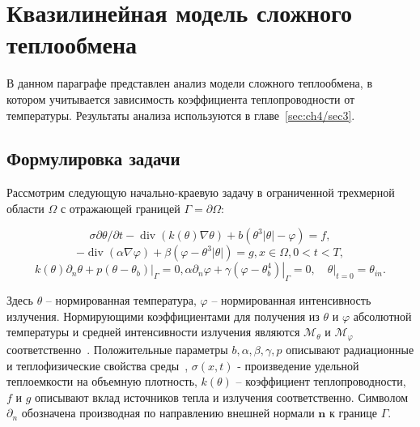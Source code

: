\section{Квазилинейная модель сложного теплообмена}
\label{sec:ch1/sec5}

В данном параграфе представлен анализ модели сложного теплообмена, в котором учитывается зависимость
коэффициента теплопроводности от температуры.
Результаты анализа используются в главе~\ref{sec:ch4/sec3}.

\subsection{Формулировка задачи}
\label{subsec:ch1/sec5/subsec1}

Рассмотрим следующую начально-краевую задачу в ограниченной трехмерной
области $\Omega$ с отражающей границей $\Gamma=\partial \Omega$:

\begin{equation}
    \label{eq:1_6:1}
    \sigma \partial \theta / \partial t
    -\operatorname{div}(k(\theta) \nabla \theta)
    +b\left(\theta^{3}|\theta|-\varphi\right)=f,
\end{equation}
\begin{equation}
    \label{eq:1_6:2}
    -\operatorname{div}(\alpha \nabla \varphi)
    +\beta\left(\varphi-\theta^{3}|\theta|\right)=g, x \in \Omega, 0<t<T,
\end{equation}
\begin{equation}
    \label{eq:1_6:3}
    k(\theta) \partial_{n} \theta+\left.p\left(\theta-\theta_{b}\right)\right|_{\Gamma}=0,
    \alpha \partial_{n} \varphi
    +\left.\gamma\left(\varphi-\theta_{b}^{4}\right)\right|_{\Gamma}=0,
    \left.\quad \theta\right|_{t=0}=\theta_{in}.
\end{equation}


Здесь $\theta$ -- нормированная температура, $\varphi$ -- нормированная интенсивность излучения.
Нормирующими коэффициентами для получения из $\theta$ и $\varphi$ абсолютной температуры
и средней интенсивности излучения являются
$\mathcal{M}_{\theta}$ и $\mathcal{M}_{\varphi}$ соответственно~\cite{Kovtanyuk2014a}.
Положительные параметры $b, \alpha, \beta, \gamma, p$ описывают радиационные
и теплофизические свойства среды~\cite{ESAIM}, $\sigma(x, t)$ - произведение удельной
теплоемкости на объемную плотность, $k(\theta)$ -- коэффициент теплопроводности,
$f$ и $g$ описывают вклад источников тепла и излучения соответственно.
Символом $\partial_{n}$ обозначена производная по направлению
внешней нормали $\mathbf{n}$ к границе $\Gamma$.

